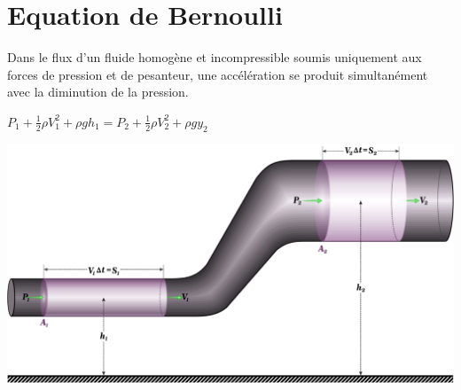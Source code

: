 \documentclass[12pt,oneside]{book}
\begin{document}
\section{Equation de Bernoulli}
Dans le flux d'un fluide homogène et incompressible soumis uniquement aux forces de pression et de pesanteur, une accélération se produit simultanément avec la diminution de la pression. \\
\begin{minipage}{0.5\linewidth}
	$ P_1 + \frac{1}{2}\rho V_1^2 + \rho gh_1 = P_2 + \frac{1}{2}\rho V_2^2+\rho g y_2 $
\end{minipage}
\begin{minipage}{0.5\linewidth}
	\includegraphics[width=\linewidth]{../pic/1103/3.png}
\end{minipage}
\end{document}
